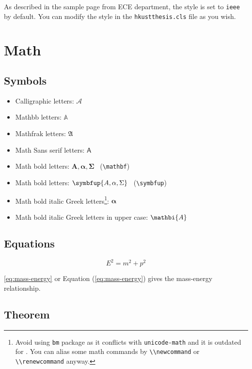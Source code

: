 As described in the sample page from ECE department, the style is set to \lstinline|ieee| by default. You can modify the style in the \lstinline|hkustthesis.cls| file as you wish.

\section{Math}

\subsection{Symbols}

\begin{itemize}
  \item Calligraphic letters: $\mathcal{A}$
  \item Mathbb letters: $\mathbb{A}$
  \item Mathfrak letters: $\mathfrak{A}$
  \item Math Sans serif letters: $\mathsf{A}$
  \item Math bold letters: $\mathbf{A, \alpha, \Sigma}$ \, (\lstinline|\mathbf|)
  \item Math bold letters: $\symbfup{A, \alpha, \Sigma}$ \, (\lstinline|\symbfup|)
\item Math bold italic Greek letters\footnote{Avoid using \lstinline|bm| package as it conflicts with \lstinline|unicode-math| and it is outdated for . You can alias some math commands by \lstinline|\\newcommand| or \lstinline|\\renewcommand| anyway.}: $\bm{\alpha}$
  \item Math bold italic Greek letters in upper case: $\mathbi{A}$
\end{itemize}

\subsection{Equations}

\begin{equation}
  E^2 = m^2 + p^2\label{eq:mass-energy}
\end{equation}

\cref{eq:mass-energy} or Equation (\ref{eq:mass-energy}) gives the mass-energy relationship.

\subsection{Theorem}

